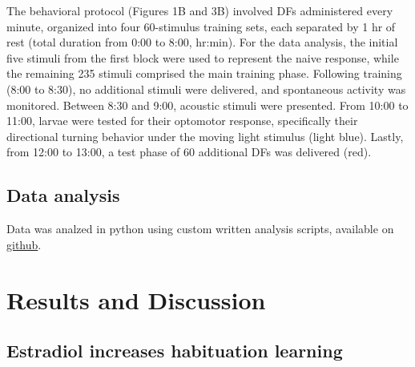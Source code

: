 \documentclass[9pt,lineno]{RandlettLab_elife}
\begin{document}
The behavioral protocol (Figures 1B and 3B) involved DFs administered every minute, organized into four 60-stimulus training sets, each separated by 1 hr of rest (total duration from 0:00 to 8:00, hr:min). For the data analysis, the initial five stimuli from the first block were used to represent the naive response, while the remaining 235 stimuli comprised the main training phase. Following training (8:00 to 8:30), no additional stimuli were delivered, and spontaneous activity was monitored. Between 8:30 and 9:00, acoustic stimuli were presented. From 10:00 to 11:00, larvae were tested for their optomotor response, specifically their directional turning behavior under the moving light stimulus (light blue). Lastly, from 12:00 to 13:00, a test phase of 60 additional DFs was delivered (red).

\subsection{Data analysis}

Data was analzed in python using custom written analysis scripts, available on \href{https://github.com/owenrandlett/2025\_HabEstrogen}{github}. 

\newpage
\section{Results and Discussion}

\subsection{Estradiol increases habituation learning}
\end{document}
